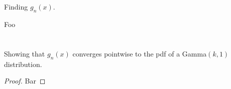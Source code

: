 \documentclass[hwnumber=4,studentnumber=20053722]{mthe353answer}
\begin{document}
  \begin{questions}
    \setcounter{question}{2}
    \question{}\noindent
    \begin{parts}
      \part{}
      Finding \(g_n(x)\).
      \begin{solution}
        Foo
      \end{solution}
      \part{}
      Showing that \(g_n(x)\) converges pointwise to the pdf of a Gamma\((k,1)\)
      distribution.
      \begin{solution}
        \begin{proof}
          Bar
        \end{proof}
      \end{solution}
    \end{parts}
  \end{questions}
\end{document}
